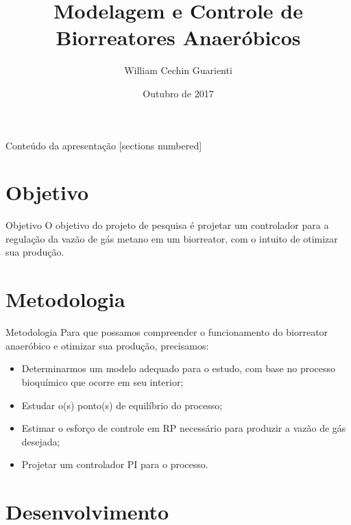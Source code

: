 \documentclass[10pt]{beamer}
\title{Modelagem e Controle de Biorreatores Anaeróbicos}
\date{Outubro de 2017}
\author{William Cechin Guarienti}
\institute{Prof. Orientador: Diego Eckhard}
\begin{document}
\maketitle

\begin{frame}{Conteúdo da apresentação}
  [sections numbered]
  \tableofcontents[hideallsubsections]
\end{frame}

\section{Objetivo}

\begin{frame}[fragile]{Objetivo}
\justifying
O objetivo do projeto de pesquisa é projetar um controlador para a regulação da vazão de gás metano em um biorreator, com o intuito de otimizar sua produção. 
  
\end{frame}



\section{Metodologia}

\begin{frame}{Metodologia}
	Para que possamos compreender o funcionamento do biorreator anaeróbico e otimizar sua produção, precisamos:
	\begin{itemize}
		\item Determinarmos um modelo adequado para o estudo, com base no processo bioquímico que ocorre em seu interior;
		\item Estudar o(s) ponto(s) de equilíbrio do processo;
		\item Estimar o esforço de controle em RP necessário para produzir a vazão de gás desejada;
		\item Projetar um controlador PI para o processo.
	\end{itemize}
\end{frame}

\section{Desenvolvimento}
\end{document}
